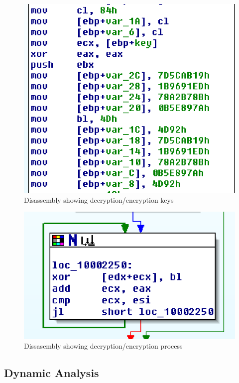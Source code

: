 \begin{figure}[h]
  \centering
  \includegraphics{CryptoKeysScreenshot}
  \caption{Disassembly showing decryption/encryption keys}
  \label{fig:atacryptkeys}
\end{figure}

\begin{figure}[h]
  \centering
  \includegraphics{CryptoAlgorithmScreenshot}
  \caption{Dissasembly showing decryption/encryption process}
  \label{fig:atacryptalgorithm}
\end{figure}


\subsection{Dynamic Analysis}

